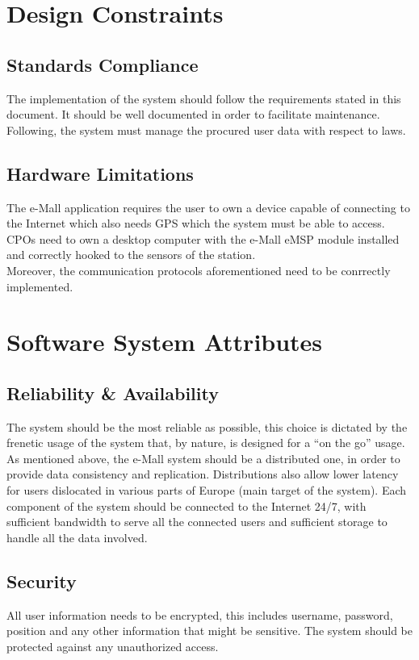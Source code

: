 \documentclass[12pt]{report}
\begin{document}
 
 

\section{Design Constraints}
\subsection{Standards Compliance}
The implementation of the system should follow the requirements stated in this document. It should be well documented in order to facilitate maintenance. Following, the system must manage the procured user data with respect to laws.
\subsection{Hardware Limitations}
The e-Mall application requires the user to own a device capable of connecting to the Internet which also needs GPS which the system must be able to access.
CPOs need to own a desktop computer with the e-Mall eMSP module installed and correctly hooked to the sensors of the station.\\
Moreover, the communication protocols aforementioned need to be conrrectly implemented.
\section{Software System Attributes}
\subsection{Reliability \& Availability}
The system should be the most reliable as possible, this choice is dictated by the frenetic usage of the system that, by nature, is designed for a “on the go” usage.
As mentioned above, the e-Mall system should be a distributed one, in order to provide data consistency and replication. Distributions also allow lower latency for users dislocated in various parts of Europe (main target of the system). Each component of the system should be connected to the Internet 24/7, with sufficient bandwidth to serve all the connected users and sufficient storage to handle all the data involved.
\subsection{Security}
All user information needs to be encrypted, this includes username, password, position and any other information that might be sensitive. The system should be protected against any unauthorized access.
\end{document}
